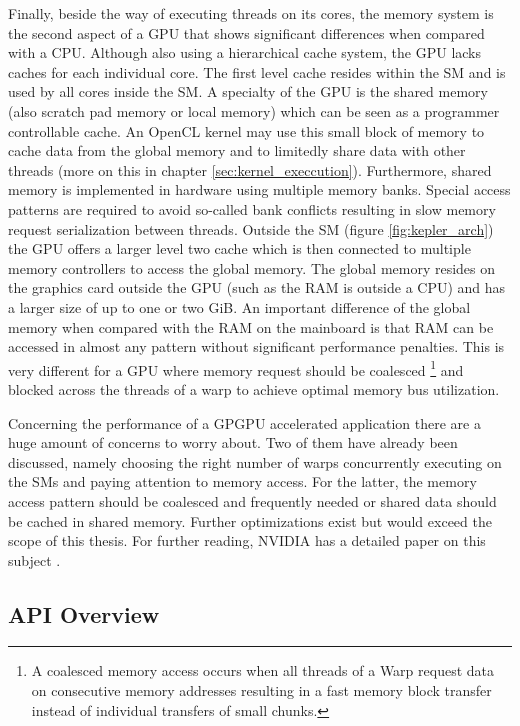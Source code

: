 Finally, beside the way of executing threads on its cores, the memory system is the second aspect of a GPU that shows significant differences when compared with a CPU. Although also using a hierarchical cache system, the GPU lacks caches for each individual core. The first level cache resides within the SM and is used by all cores inside the SM. A specialty of the GPU is the shared memory (also scratch pad memory or local memory) which can be seen as a programmer controllable cache. An OpenCL kernel may use this small block of memory to cache data from the global memory and to limitedly share data with other threads (more on this in chapter \ref{sec:kernel_execcution}). Furthermore, shared memory is implemented in hardware using multiple memory banks. Special access patterns are required to avoid so-called bank conflicts resulting in slow memory request serialization between threads. Outside the SM (figure \ref{fig:kepler_arch}) the GPU offers a larger level two cache which is then connected to multiple memory controllers to access the global memory. The global memory resides on the graphics card outside the GPU (such as the RAM is outside a CPU) and has a larger size of up to one or two GiB. An important difference of the global memory when compared with the RAM on the mainboard is that RAM can be accessed in almost any pattern without significant performance penalties. This is very different for a GPU where memory request should be coalesced \footnote{A coalesced memory access occurs when all threads of a Warp request data on consecutive memory addresses resulting in a fast memory block transfer instead of individual transfers of small chunks.} and blocked across the threads of a warp to achieve optimal memory bus utilization.

Concerning the performance of a GPGPU accelerated application there are a huge amount of concerns to worry about. Two of them have already been discussed, namely choosing the right number of warps concurrently executing on the SMs and paying attention to memory access. For the latter, the memory access pattern should be coalesced and frequently needed or shared data should be cached in shared memory. Further optimizations exist but would exceed the scope of this thesis. For further reading, NVIDIA has a detailed paper on this subject \cite{gpu_optimizations}.

\subsection{API Overview}


